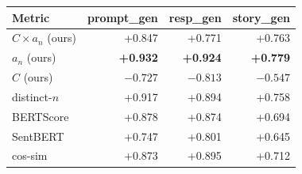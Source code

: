 \begin{tabular}{@{}l rrr@{}}
\toprule
Metric & prompt\_gen & resp\_gen & story\_gen \\
\midrule
$C \!\times\! a_n$ (ours) & +0.847 & +0.771 & +0.763 \\
$a_n$ (ours) & \textbf{+0.932} & \textbf{+0.924} & \textbf{+0.779} \\
$C$ (ours) & $-0.727$ & $-0.813$ & $-0.547$ \\
distinct-$n$ & +0.917 & +0.894 & +0.758 \\
BERTScore & +0.878 & +0.874 & +0.694 \\
SentBERT & +0.747 & +0.801 & +0.645 \\
cos-sim & +0.873 & +0.895 & +0.712 \\
\bottomrule
\end{tabular}
